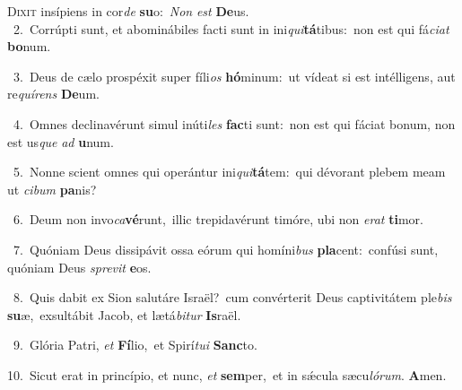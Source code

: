 \lettrine{\initial\textcolor{\initialcolor}{D}}{ixit} insípiens in cor\textit{de} \textbf{su}\-o:~\star \textit{Non} \textit{est} \textbf{De}\-us.\\
{\numbfont\textcolor{\numbcolor}{~2.}}~Corrúpti sunt, et abominábiles facti sunt in ini\-\textit{qui}\-\textbf{tá}tibus:~\star non est qui fá\-\textit{ci}\-\textit{at} \textbf{bo}\-num.\par
{\numbfont\textcolor{\numbcolor}{~3.}}~Deus de cælo prospéxit super fíli\textit{os} \textbf{hó}\-minum:~\star ut vídeat si est intélligens, aut re\-\textit{quí}\-\textit{rens} \textbf{De}\-um.\par
{\numbfont\textcolor{\numbcolor}{~4.}}~Omnes declinavérunt simul inúti\textit{les} \textbf{fac}\-ti sunt:~\star non est qui fáciat bonum, non est us\textit{que} \textit{ad} \textbf{u}\-num.\par
{\numbfont\textcolor{\numbcolor}{~5.}}~Nonne scient omnes qui operántur ini\-\textit{qui}\-\textbf{tá}tem:~\star qui dévorant plebem meam ut \textit{ci}\-\textit{bum} \textbf{pa}\-nis?\par
{\numbfont\textcolor{\numbcolor}{~6.}}~Deum non invo\-\textit{ca}\-\textbf{vé}runt,~\star illic trepidavérunt timóre, ubi non \textit{e}\-\textit{rat} \textbf{ti}\-mor.\par
{\numbfont\textcolor{\numbcolor}{~7.}}~Quóniam Deus dissipávit ossa eórum qui homíni\textit{bus} \textbf{pla}\-cent:~\star confúsi sunt, quóniam Deus \textit{spre}\-\textit{vit} \textbf{e}\-os.\par
{\numbfont\textcolor{\numbcolor}{~8.}}~Quis dabit ex Sion salutáre Israël?~\dagger cum convérterit Deus captivitátem ple\textit{bis} \textbf{su}\-æ,~\star exsultábit Jacob, et lætá\-\textit{bi}\-\textit{tur} \textbf{Is}\-raël.\par
{\numbfont\textcolor{\numbcolor}{~9.}}~Glória Patri, \textit{et} \textbf{Fí}\-lio,~\star et Spirí\-\textit{tu}\-\textit{i} \textbf{Sanc}\-to.\par
{\numbfont\textcolor{\numbcolor}{10.}}~Sicut erat in princípio, et nunc, \textit{et} \textbf{sem}\-per,~\star et in sǽcula sæcu\-\textit{ló}\-\textit{rum}. \textbf{A}\-men.\par
